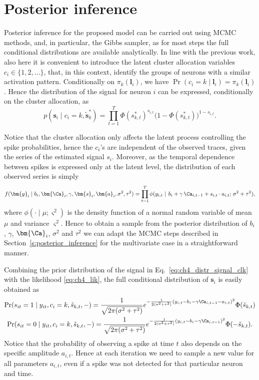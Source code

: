 \section{Posterior inference}
Posterior inference for the proposed model can be carried out using MCMC methods, and, in particular, the Gibbs sampler, as for most steps the full conditional distributions are available analytically.
In line with the previous work, also here it is convenient to introduce the latent cluster allocation variables $c_i\in\{1,2,\dots\}$, that, in this context, identify the groups of neurons with a similar activation pattern.
Conditionally on $\pi_k(\bm{l}_i)$, we have $\Pr(c_i = k\mid \bm{l}_i) = \pi_k(\bm{l}_i)$.
Hence the distribution of the signal for neuron $i$ can be expressed, conditionally on the cluster allocation, as
\begin{equation}
p(\bm{s}_i\mid c_i=k,\tilde{\bm{s}}^*_k)= \prod_{t=1}^T \Phi(s_{k,t}^*)^{s_{i,t}}\big(1-\Phi(s_{k,t}^*)\big)^{1-s_{i,t}}.
\label{eq:ch4_distr_signal_clk}
\end{equation}


Notice that the cluster allocation only affects the latent process controlling the spike probabilities, hence the $c_i$'s are independent of the observed traces, given the series of the estimated signal $s_i$. Moreover, as the temporal dependence between spikes is expressed only at the latent level, the distribution of each observed series is simply
\begin{equation}
f(\bm{y}_i\mid b_i, \bm{\Ca}_i,\gamma,\bm{s}_i,\bm{a}_i,\sigma^2,\tau^2) = \prod_{t=1}^T \phi(y_{i,t}\mid\, b_i + \gamma\, \Ca_{i,t-1} + s_{i,t}\cdot a_{i,t};\, \sigma^2+\tau^2),
\label{eq:ch4_lik}
\end{equation}
where $\phi(\cdot\mid\mu;\varsigma^2)$ is the density function of a normal random variable of mean $\mu$ and variance $\varsigma^2$. Hence to obtain a sample from the posterior distribution of $b_i$, $\gamma$, $\bm{\Ca}_i$, $\sigma^2$ and $\tau^2$ we can adapt the MCMC steps described in Section~\ref{s:posterior_inference} for the multivariate case in a straightforward manner.

Combining the prior distribution of the signal in Eq.~\eqref{eq:ch4_distr_signal_clk} with the likelihood \eqref{eq:ch4_lik}, the full conditional distribution of $\bm{s}_i$ is easily obtained as
\begin{gather*}
\Pr(s_{it} = 1 \mid y_{it}, c_i=k, \tilde{s}_{k,t}, -) = \frac{1}{\sqrt{2\pi(\sigma^2+\tau^2)}}e^{-\frac{1}{2(\sigma^2+\tau^2)}(y_{i,t} - b_i - \gamma \Ca_{i,t-1}- a_{i,t})^2 } \Phi(\tilde{s}_{k,t}) \\
%
\Pr(s_{it} = 0 \mid y_{it}, c_i=k, \tilde{s}_{k,t}, -) = \frac{1}{\sqrt{2\pi(\sigma^2+\tau^2)}}e^{-\frac{1}{2(\sigma^2+\tau^2)}(y_{i,t} - b_i - \gamma \Ca_{i,t-1})^2 } \Phi(-\tilde{s}_{k,t}).
\end{gather*}
Notice that the probability of observing a spike at time $t$ also depends on the specific amplitude $a_{i,t}$. Hence at each iteration we need to sample a new value for all parameters $a_{i,t}$, even if a spike was not detected for that particular neuron and time.

